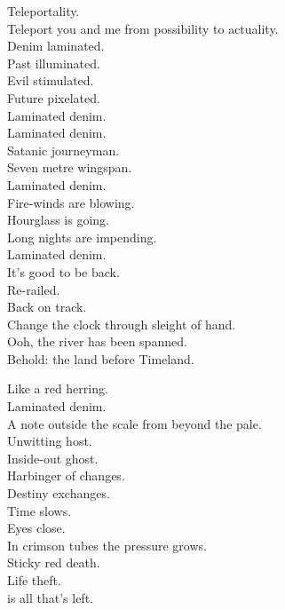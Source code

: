 Teleportality. \\
Teleport you and me from possibility to actuality. \\
Denim laminated. \\
Past illuminated. \\
Evil stimulated. \\
Future pixelated. \\

Laminated denim. \\

Laminated denim. \\
Satanic journeyman. \\
Seven metre wingspan. \\
Laminated denim. \\
Fire-winds are blowing. \\
Hourglass is going. \\
Long nights are impending. \\
Laminated denim. \\

It's good to be back. \\
Re-railed. \\
Back on track. \\
Change the clock through sleight of hand. \\
Ooh, the river has been spanned. \\
Behold: the land before Timeland. \\




Like a red herring. \\
Laminated denim. \\
A note outside the scale from beyond the pale. \\
Unwitting host. \\
Inside-out ghost. \\
Harbinger of changes. \\
Destiny exchanges. \\
Time slows. \\
Eyes close. \\
In crimson tubes the pressure grows. \\
Sticky red death. \\
Life theft. \\
 is all that's left. \\


